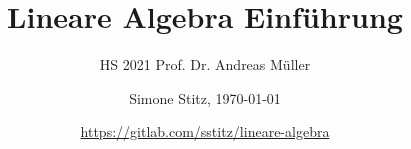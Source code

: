 \documentclass[8pt, a4paper, landscape, fleqn]{scrartcl}
\title{Lineare Algebra Einführung}
\subtitle{HS 2021 Prof. Dr. Andreas Müller}
\author{Simone Stitz, \today}
\date{{\small \url{https://gitlab.com/sstitz/lineare-algebra}}}
\begin{document}
	\begin{multicols*}{3}
	
		\maketitle
		
		
		
		
		
		
		
		
		
		

		    
	\end{multicols*}
\end{document}
